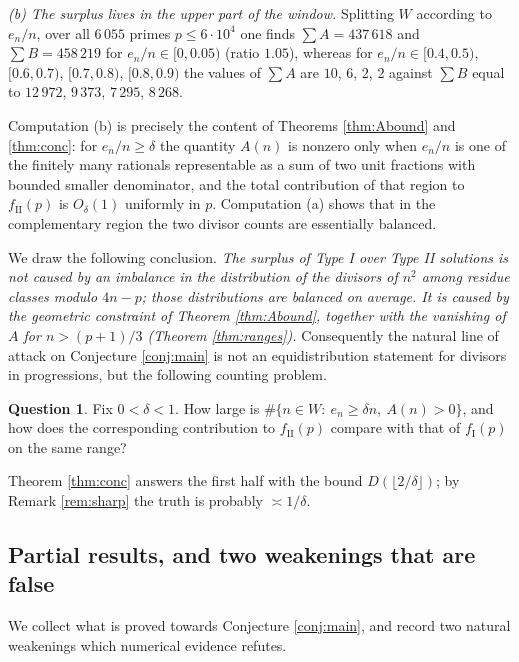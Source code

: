 \documentclass[11pt,reqno]{amsart}
\theoremstyle{plain}
\theoremstyle{definition}
\newtheorem{question}[theorem]{Question}
\numberwithin{equation}{section}
\newcommand{\fI}{f_{\mathrm{I}}}
\newcommand{\fII}{f_{\mathrm{II}}}
\begin{document}
\emph{(b) The surplus lives in the upper part of the window.} Splitting $W$ according
to $e_{n}/n$, over all $6\,055$ primes $p\le6\cdot10^{4}$ one finds
$\sum A=437\,618$ and $\sum B=458\,219$ for $e_{n}/n\in[0,0.05)$ (ratio $1.05$),
whereas for $e_{n}/n\in[0.4,0.5)$, $[0.6,0.7)$, $[0.7,0.8)$, $[0.8,0.9)$ the values of
$\sum A$ are $10$, $6$, $2$, $2$ against $\sum B$ equal to $12\,972$, $9\,373$,
$7\,295$, $8\,268$.

Computation (b) is precisely the content of Theorems \ref{thm:Abound} and
\ref{thm:conc}: for $e_{n}/n\ge\delta$ the quantity $A(n)$ is nonzero only when
$e_{n}/n$ is one of the finitely many rationals representable as a sum of two unit
fractions with bounded smaller denominator, and the total contribution of that region
to $\fII(p)$ is $O_{\delta}(1)$ uniformly in $p$. Computation (a) shows that in the
complementary region the two divisor counts are essentially balanced.

We draw the following conclusion. \emph{The surplus of Type I over Type II solutions
is not caused by an imbalance in the distribution of the divisors of $n^{2}$ among
residue classes modulo $4n-p$; those distributions are balanced on average. It is
caused by the geometric constraint of Theorem \ref{thm:Abound}, together with the
vanishing of $A$ for $n>(p+1)/3$ (Theorem \ref{thm:ranges}).} Consequently the natural
line of attack on Conjecture \ref{conj:main} is not an equidistribution statement for
divisors in progressions, but the following counting problem.

\begin{question}\label{q:S}
Fix $0<\delta<1$. How large is
$\#\{n\in W:\ e_{n}\ge\delta n,\ A(n)>0\}$, and how does the corresponding
contribution to $\fII(p)$ compare with that of $\fI(p)$ on the same range?
\end{question}

Theorem \ref{thm:conc} answers the first half with the bound
$D(\lfloor2/\delta\rfloor)$; by Remark \ref{rem:sharp} the truth is probably
$\asymp1/\delta$.


\subsection{Partial results, and two weakenings that are false}\label{sec:partial}

We collect what is proved towards Conjecture \ref{conj:main}, and record two natural
weakenings which numerical evidence refutes.
\end{document}
